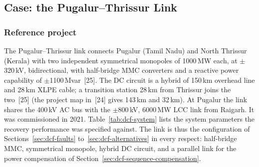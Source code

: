 \subsection{Case: the Pugalur--Thrissur Link}
\label{sec:dcf-pugalur}

\subsubsection{Reference project}
\label{sec:dcf-pugalur-project}

The Pugalur--Thrissur link connects Pugalur (Tamil Nadu) and North Thrissur
(Kerala) with two independent symmetrical monopoles of 1000\,MW each, at
$\pm$320\,kV, bidirectional, with half-bridge MMC converters and a reactive
power capability of $\pm$1100\,Mvar~[25]. The DC circuit is a hybrid of
150\,km overhead line and 28\,km XLPE cable; a transition station 28\,km
from Thrissur joins the two~[25] (the project map in~[24] gives 143\,km and
32\,km). At Pugalur the link shares the 400\,kV AC bus with the
$\pm$800\,kV, 6000\,MW LCC link from Raigarh. It was commissioned in 2021.
Table~\ref{tab:dcf-system} lists the system parameters the recovery
performance was specified against. The link is thus the configuration of
Sections~\ref{sec:dcf-faults} to~\ref{sec:dcf-alternatives} in every
respect: half-bridge MMC, symmetrical monopole, hybrid DC circuit, and a
parallel link for the power compensation of
Section~\ref{sec:dcf-sequence-compensation}.

